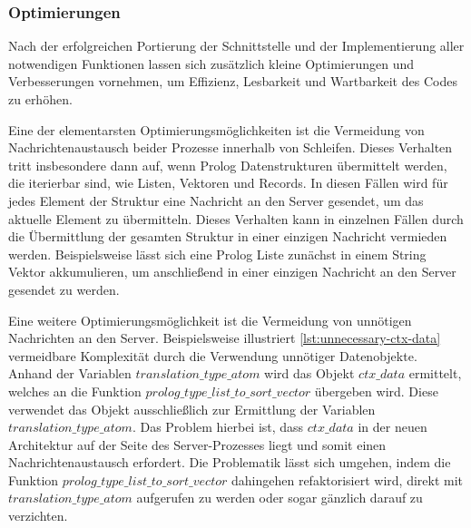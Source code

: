 \subsubsection{Optimierungen}
\label{subsec:optimizations}
Nach der erfolgreichen Portierung der Schnittstelle und der Implementierung aller notwendigen Funktionen
lassen sich zusätzlich kleine Optimierungen und Verbesserungen vornehmen, um Effizienz, Lesbarkeit und Wartbarkeit des Codes zu erhöhen.

Eine der elementarsten Optimierungsmöglichkeiten ist die Vermeidung von Nachrichtenaustausch beider Prozesse
innerhalb von Schleifen. Dieses Verhalten tritt insbesondere dann auf, wenn Prolog Datenstrukturen übermittelt werden,
die iterierbar sind, wie Listen, Vektoren und Records.
In diesen Fällen wird für jedes Element der Struktur eine Nachricht an den Server gesendet,
um das aktuelle Element zu übermitteln.
Dieses Verhalten kann in einzelnen Fällen durch die Übermittlung der gesamten Struktur in einer einzigen Nachricht vermieden werden.
Beispielsweise lässt sich eine Prolog Liste zunächst in einem String Vektor akkumulieren,
um anschließend in einer einzigen Nachricht an den Server gesendet zu werden.

Eine weitere Optimierungsmöglichkeit ist die Vermeidung von unnötigen Nachrichten an den Server.
Beispielsweise illustriert \cref{lst:unnecessary-ctx-data} vermeidbare Komplexität durch die Verwendung unnötiger Datenobjekte.
Anhand der Variablen $translation\_type\_atom$ wird das Objekt $ctx\_data$ ermittelt, welches an die Funktion $prolog\_type\_list\_to\_sort\_vector$ übergeben wird.
Diese verwendet das Objekt ausschließlich zur Ermittlung der Variablen $translation\_type\_atom$. Das Problem hierbei ist,
dass $ctx\_data$ in der neuen Architektur auf der Seite des Server-Prozesses liegt und somit einen Nachrichtenaustausch erfordert.
Die Problematik lässt sich umgehen, indem die Funktion $prolog\_type\_list\_to\_sort\_vector$ dahingehen refaktorisiert wird,
direkt mit $translation\_type\_atom$ aufgerufen zu werden oder sogar gänzlich darauf zu verzichten.

